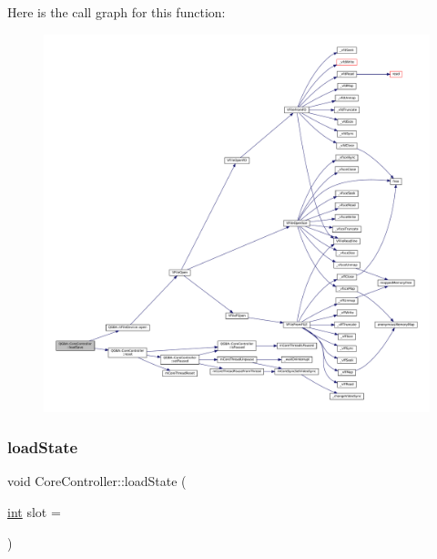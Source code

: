 Here is the call graph for this function\+:
\nopagebreak
\begin{figure}[H]
\begin{center}
\leavevmode
\includegraphics[width=350pt]{class_q_g_b_a_1_1_core_controller_a798a269094b1066d112bd530cd2b87f1_cgraph}
\end{center}
\end{figure}
\mbox{\label{class_q_g_b_a_1_1_core_controller_ab568b1cb1680fcce174e54eebde22381}} 
\subsubsection{\texorpdfstring{load\+State}{loadState}}
{\footnotesize\ttfamily void Core\+Controller\+::load\+State (\begin{DoxyParamCaption}\item[{\mbox{\hyperlink{ioapi_8h_a787fa3cf048117ba7123753c1e74fcd6}{int}}}]{slot = {} }\end{DoxyParamCaption})\hspace{0.3cm}{\ttfamily [slot]}}

